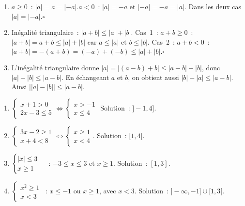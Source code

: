 
\begin{enumerate}
  \item $a\geq0$~: $|a|=a=|-a|$.\quad $a<0$~: $|a|=-a$ et $|-a|=-a=|a|$.
        Dans les deux cas $|a|=|-a|$.\hfill$\square$
  \item In\'egalit\'e triangulaire~: $|a+b|\leq|a|+|b|$.
        Cas~1~: $a+b\geq0$~: $|a+b|=a+b\leq|a|+|b|$ car $a\leq|a|$ et $b\leq|b|$.
        Cas~2~: $a+b<0$~: $|a+b|=-(a+b)=(-a)+(-b)\leq|a|+|b|$.\hfill$\square$
  \item L'in\'egalit\'e triangulaire donne
        $|a|=|(a-b)+b|\leq|a-b|+|b|$, donc $|a|-|b|\leq|a-b|$.
        En \'echangeant $a$ et $b$, on obtient aussi
        $|b|-|a|\leq|a-b|$. Ainsi $\bigl||a|-|b|\bigr|\leq|a-b|$.
\end{enumerate}


\begin{enumerate}
  \item $\begin{cases}x+1>0\\2x-3\leq5\end{cases}\Leftrightarrow\begin{cases}x>-1\\x\leq4\end{cases}$
        Solution~: $]-1,4]$.
  \item $\begin{cases}3x-2\geq1\\x+4<8\end{cases}
        \Leftrightarrow\begin{cases}x\geq1\\x<4\end{cases}$.
        Solution~: $[1,4[$.
  \item $\begin{cases}\left|x\right|\leq3\\x\geq1\end{cases}$~:
        $-3\leq x\leq3$ et $x\geq1$. Solution~: $[1,3]$.
  \item $\begin{cases}x^2\geq1\\x<3\end{cases}$~:
        $x\leq-1$ ou $x\geq1$, avec $x<3$.
        Solution~: $]-\infty,-1]\cup[1,3[$.
\end{enumerate}

